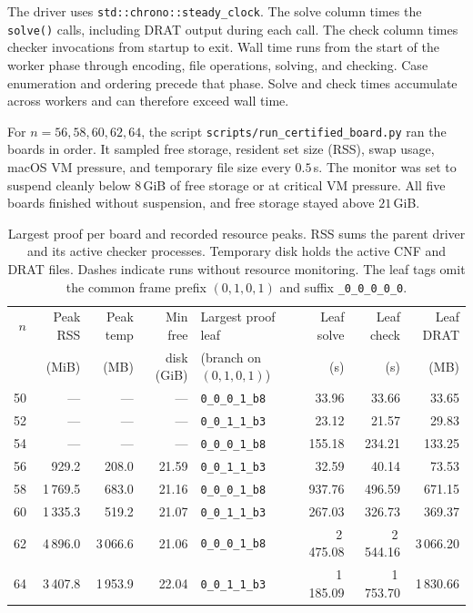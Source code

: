 \documentclass[11pt,a4paper]{article}
\theoremstyle{result}
\theoremstyle{definition}
\theoremstyle{remark}
\begin{document}
The driver uses \texttt{std::chrono::steady\_clock}.
The solve column times the \texttt{solve()} calls, including DRAT output
during each call. The check column times checker invocations
from startup to exit. Wall time runs from the start of the
worker phase through encoding, file operations, solving, and
checking. Case enumeration and ordering precede that phase.
Solve and check times accumulate across workers and can therefore
exceed wall time.

For $n=56,58,60,62,64$, the script
\nolinkurl{scripts/run_certified_board.py} ran the boards in order.
It sampled free storage, resident set size (RSS), swap usage,
macOS VM pressure, and temporary file size every $0.5$\,s.
The monitor was set to suspend cleanly below $8$\,GiB of free
storage or at critical VM pressure. All five boards finished
without suspension, and free storage stayed above $21$\,GiB.

\begin{table}[!htbp]
\centering\small
\caption{Largest proof per board and recorded resource peaks.
  RSS sums the parent driver and its active checker processes.
  Temporary disk holds the active CNF and DRAT files.
  Dashes indicate runs without resource monitoring. The leaf
  tags omit the common frame prefix $(0,1,0,1)$ and suffix
  \texttt{\_0\_0\_0\_0\_0}.}
\label{tab:resources}
\setlength{\tabcolsep}{4.0pt}
\renewcommand{\arraystretch}{1.18}
\begin{tabular}{@{}rrrrlrrr@{}}
\toprule
$n$ & Peak RSS & Peak temp & Min free & Largest proof leaf & Leaf solve & Leaf check & Leaf DRAT \\
    & (MiB) & (MB) & disk (GiB) & (branch on $(0,1,0,1)$) & (s) & (s) & (MB) \\
\midrule
50 & --- & --- & --- & \texttt{0\_0\_0\_1\_b8} & 33.96 & 33.66 & 33.65 \\
52 & --- & --- & --- & \texttt{0\_0\_1\_1\_b3} & 23.12 & 21.57 & 29.83 \\
54 & --- & --- & --- & \texttt{0\_0\_0\_1\_b8} & 155.18 & 234.21 & 133.25 \\
\midrule
56 & 929.2 & 208.0 & 21.59 & \texttt{0\_0\_1\_1\_b3} & 32.59 & 40.14 & 73.53 \\
58 & 1\,769.5 & 683.0 & 21.16 & \texttt{0\_0\_0\_1\_b8} & 937.76 & 496.59 & 671.15 \\
60 & 1\,335.3 & 519.2 & 21.07 & \texttt{0\_0\_1\_1\_b3} & 267.03 & 326.73 & 369.37 \\
62 & 4\,896.0 & 3\,066.6 & 21.06 & \texttt{0\_0\_0\_1\_b8} & 2\,475.08 & 2\,544.16 & 3\,066.20 \\
64 & 3\,407.8 & 1\,953.9 & 22.04 & \texttt{0\_0\_1\_1\_b3} & 1\,185.09 & 1\,753.70 & 1\,830.66 \\
\bottomrule
\end{tabular}
\end{table}
\end{document}
